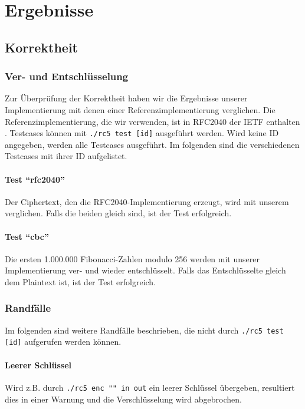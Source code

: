 \documentclass[course=erap]{aspdoc}
\begin{document}
\section{Ergebnisse}

\subsection{Korrektheit}

\subsubsection{Ver- und Entschlüsselung}

Zur Überprüfung der Korrektheit haben wir die Ergebnisse unserer Implementierung mit denen einer Referenzimplementierung verglichen. Die Referenzimplementierung, die wir verwenden, ist in RFC2040 der IETF enthalten \cite{rfc2040}. Testcases können mit \texttt{./rc5 test [id]} ausgeführt werden. Wird keine ID angegeben, werden alle Testcases ausgeführt. Im folgenden sind die verschiedenen Testcases mit ihrer ID aufgelistet.

\paragraph{Test ``rfc2040''} Der Ciphertext, den die RFC2040-Implementierung erzeugt, wird mit unserem verglichen. Falls die beiden gleich sind, ist der Test erfolgreich.

\paragraph{Test ``cbc''} Die ersten 1.000.000 Fibonacci-Zahlen modulo 256 werden mit unserer Implementierung ver- und wieder entschlüsselt. Falls das Entschlüsselte gleich dem Plaintext ist, ist der Test erfolgreich.

\subsubsection{Randfälle}

Im folgenden sind weitere Randfälle beschrieben, die nicht durch \texttt{./rc5 test [id]} aufgerufen werden können.

\paragraph{Leerer Schlüssel} Wird z.B. durch \texttt{./rc5 enc "{}"{} in out} ein leerer Schlüssel übergeben, resultiert dies in einer Warnung und die Verschlüsselung wird abgebrochen.
\end{document}
